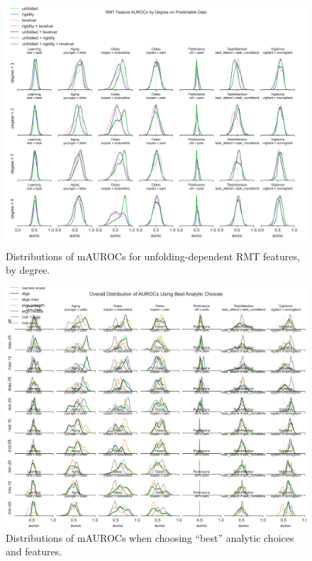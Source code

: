 \documentclass{article}  %
\begin{document}
\begin{figure}[H]
\begin{center}
\includegraphics[width=\textwidth,height=0.9\textheight,keepaspectratio]{rmt_feature_auroc_by_degree.png}
\end{center}
\caption
{ \label{fig:fine-degree}
Distributions of mAUROCs for unfolding-dependent RMT features, by degree.}
\end{figure}


\begin{figure}[H]
\begin{center}
\includegraphics[width=\textwidth,height=0.9\textheight,keepaspectratio]{best_rmt_params_by_subgroup.png}
\end{center}
\caption
{ \label{fig:best-params}
Distributions of mAUROCs when choosing ``best'' analytic choices and features.}
\end{figure}
\end{document}
